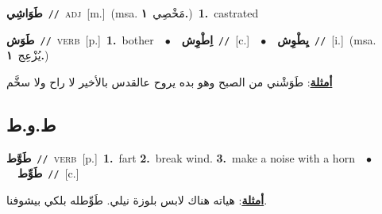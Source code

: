 \documentclass[10pt,a4paper,twoside]{article} %
\begin{document}
\begin{multicols}{2}
{\setlength\topsep{0pt}\textbf{\foreignlanguage{arabic}{طَوَاشِي}}\ {\color{gray}\texttt{//}\color{black}}\ \textsc{adj}\ [m.]\ \color{gray}(msa. \foreignlanguage{arabic}{مَخْصِي}~\foreignlanguage{arabic}{\textbf{١.}})\color{black}\ \textbf{1.}~castrated\ } \vspace{2mm}

{\setlength\topsep{0pt}\textbf{\foreignlanguage{arabic}{طَوَش}}\ {\color{gray}\texttt{//}\color{black}}\ \textsc{verb}\ [p.]\ \textbf{1.}~bother\ \ $\bullet$\ \ \setlength\topsep{0pt}\textbf{\foreignlanguage{arabic}{اِطْوِش}}\ {\color{gray}\texttt{//}\color{black}}\ [c.]\ \ $\bullet$\ \ \setlength\topsep{0pt}\textbf{\foreignlanguage{arabic}{يِطْوِش}}\ {\color{gray}\texttt{//}\color{black}}\ [i.]\ \color{gray}(msa. \foreignlanguage{arabic}{يُزْعِج}~\foreignlanguage{arabic}{\textbf{١.}})\color{black}\  \begin{flushright}\color{gray}\foreignlanguage{arabic}{\textbf{\underline{\foreignlanguage{arabic}{أمثلة}}}: طَوَشْني من الصبح وهو بده يروح عالقدس بالأخير لا راح ولا سخَّم}\end{flushright}\color{black}} \vspace{2mm}

\vspace{-3mm}
\subsection*{\color{blue}\foreignlanguage{arabic}{ط.و.ط}\color{blue}{}} 

{\setlength\topsep{0pt}\textbf{\foreignlanguage{arabic}{طَوَّط}}\ {\color{gray}\texttt{//}\color{black}}\ \textsc{verb}\ [p.]\ \textbf{1.}~fart  \textbf{2.}~break wind.  \textbf{3.}~make a noise with a horn\ \ $\bullet$\ \ \setlength\topsep{0pt}\textbf{\foreignlanguage{arabic}{طَوِّط}}\ {\color{gray}\texttt{//}\color{black}}\ [c.]\  \begin{flushright}\color{gray}\foreignlanguage{arabic}{\textbf{\underline{\foreignlanguage{arabic}{أمثلة}}}: هياته هناك لابس بلوزة نيلي. طَوِّطله بلكي بيشوفنا.}\end{flushright}\color{black}} \vspace{2mm}


\end{multicols}
\end{document}
